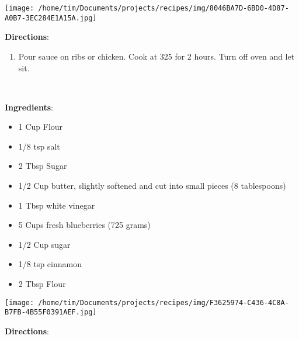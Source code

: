 \documentclass[11pt, twoside, openany]{book}
\begin{document}
\begin{minipage}[t]{0.2\linewidth}
\centering \strut\vspace*{-\baselineskip}\newline
\texttt{[image: /home/tim/Documents/projects/recipes/img/8046BA7D-6BD0-4D87-A0B7-3EC284E1A15A.jpg]}\\
\end{minipage}\vspace{3mm}
\textbf{Directions}:
\vspace{-3mm}\begin{enumerate}\setlength\itemsep{-1mm}
\item Pour sauce on ribs or chicken. Cook at 325 for 2 hours. Turn off oven and let sit.
\end{enumerate}
 \label{blueberry-kuchen-recipe}\hfill\textit{}\\
\begin{minipage}[t]{0.8\linewidth}
\textbf{Ingredients}:\vspace{-3mm}
\begin{multicols}{2}
\begin{itemize}\setlength\itemsep{-1mm}
\item 1 Cup Flour
\item 1/8 tsp salt
\item 2 Tbsp Sugar
\item 1/2 Cup butter, slightly softened and cut into small pieces (8 tablespoons)
\item 1 Tbsp white vinegar
\item 5 Cups fresh blueberries (725 grams)
\item 1/2 Cup sugar
\item 1/8 tsp cinnamon
\item 2 Tbsp Flour
\end{itemize}
\end{multicols}
\end{minipage}
\begin{minipage}[t]{0.2\linewidth}
\centering \strut\vspace*{-\baselineskip}\newline
\texttt{[image: /home/tim/Documents/projects/recipes/img/F3625974-C436-4C8A-B7FB-4B55F0391AEF.jpg]}\\
\end{minipage}\vspace{3mm}
\textbf{Directions}:
\end{document}
